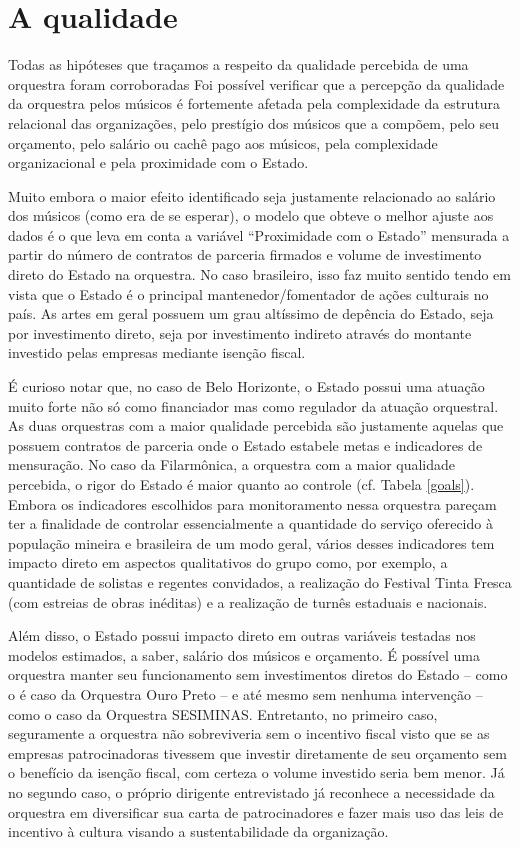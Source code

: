\documentclass[a4paper, 12pt, openright, oneside, german, french, english, brazil]{abntex2}
\begin{document}
        \section{A qualidade}
	
	Todas as hipóteses que traçamos a respeito da qualidade percebida de uma orquestra foram corroboradas Foi possível verificar que a percepção da qualidade da orquestra pelos músicos é fortemente afetada pela complexidade da estrutura relacional das organizações, pelo prestígio dos músicos que a compõem, pelo seu orçamento, pelo salário ou cachê pago aos músicos, pela complexidade organizacional e pela proximidade com o Estado.

        Muito embora o maior efeito identificado seja justamente relacionado ao salário dos músicos (como era de se esperar), o modelo que obteve o melhor ajuste aos dados é o que leva em conta a variável ``Proximidade com o Estado'' mensurada a partir do número de contratos de parceria firmados e volume de investimento direto do Estado na orquestra. No caso brasileiro, isso faz muito sentido tendo em vista que o Estado é o principal mantenedor/fomentador de ações culturais no país. As artes em geral possuem um grau altíssimo de depência do Estado, seja por investimento direto, seja por investimento indireto através do montante investido pelas empresas mediante isenção fiscal.

        É curioso notar que, no caso de Belo Horizonte, o Estado possui uma atuação muito forte não só como financiador mas como regulador da atuação orquestral. As duas orquestras com a maior qualidade percebida são justamente aquelas que possuem contratos de parceria onde o Estado estabele metas e indicadores de mensuração. No caso da Filarmônica, a orquestra com a maior qualidade percebida, o rigor do Estado é maior quanto ao controle (cf. Tabela \ref{goals}). Embora os indicadores escolhidos para monitoramento nessa orquestra pareçam ter a finalidade de controlar essencialmente a quantidade do serviço oferecido à população mineira e brasileira de um modo geral, vários desses indicadores tem impacto direto em aspectos qualitativos do grupo como, por exemplo, a quantidade de solistas e regentes convidados, a realização do Festival Tinta Fresca (com estreias de obras inéditas) e a realização de turnês estaduais e nacionais.

        Além disso, o Estado possui impacto direto em outras variáveis testadas nos modelos estimados, a saber, salário dos músicos e orçamento. É possível uma orquestra manter seu funcionamento sem investimentos diretos do Estado -- como o é caso da Orquestra Ouro Preto -- e até mesmo sem nenhuma intervenção -- como o caso da Orquestra SESIMINAS. Entretanto, no primeiro caso, seguramente a orquestra não sobreviveria sem o incentivo fiscal visto que se as empresas patrocinadoras tivessem que investir diretamente de seu orçamento sem o benefício da isenção fiscal, com certeza o volume investido seria bem menor. Já no segundo caso, o próprio dirigente entrevistado já reconhece a necessidade da orquestra em diversificar sua carta de patrocinadores e fazer mais uso das leis de incentivo à cultura visando a sustentabilidade da organização.
\end{document}
